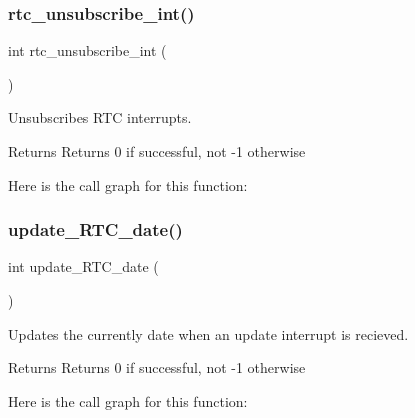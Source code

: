 \subsubsection{\texorpdfstring{rtc\_unsubscribe\_int()}{rtc\_unsubscribe\_int()}}
{\footnotesize\ttfamily int rtc\+\_\+unsubscribe\+\_\+int (\begin{DoxyParamCaption}{ }\end{DoxyParamCaption})}



Unsubscribes R\+TC interrupts. 

\begin{DoxyReturn}{Returns}
Returns 0 if successful, not -\/1 otherwise 
\end{DoxyReturn}
Here is the call graph for this function\+:
\mbox{\label{group__rtc_gac55b23b9b681e0bd120a88e35580825a}} 
\subsubsection{\texorpdfstring{update\_RTC\_date()}{update\_RTC\_date()}}
{\footnotesize\ttfamily int update\+\_\+\+R\+T\+C\+\_\+date (\begin{DoxyParamCaption}{ }\end{DoxyParamCaption})}



Updates the currently date when an update interrupt is recieved. 

\begin{DoxyReturn}{Returns}
Returns 0 if successful, not -\/1 otherwise 
\end{DoxyReturn}
Here is the call graph for this function\+:
